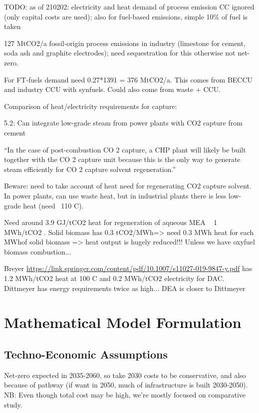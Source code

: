 TODO: as of 210202: electricity and heat demand of process emission CC ignored
(only capital costs are used); also for fuel-based emissions, simple 10\% of
fuel is taken

127 MtCO2/a fossil-origin process emissions in industry (limestone for cement,
soda ash and graphite electrodes); need sequestration for this otherwise not
net-zero.

For FT-fuels demand need 0.27*1391 = 376 MtCO2/a. This comes from BECCU and
industry CCU with synfuels. Could also come from waste + CCU.


Comparison of heat/electricity requirements for capture:

 5.2: Can integrate low-grade steam from power plants with
CO2 capture from cement

``In the case of post-combustion CO 2 capture, a CHP plant will likely be built
together with the CO 2 capture unit because this is the only way to generate
steam efficiently for CO 2 capture solvent regeneration.''

Beware: need to take account of heat need for regenerating CO2 capture solvent.
In power plants, can use waste heat, but in industrial plants there is less
low-grade heat (need ~110 C). 

Need around 3.9 GJ/tCO2 heat for regeneration of aqueous MEA ~ 1 MWh/tCO2
. Solid biomass has 0.3 tCO2/MWh\th => need 0.3 MWh heat for
each MWh\th of solid biomass => heat output is hugely reduced!!! Unless we have
oxyfuel biomass combustion...

Breyer \url{https://link.springer.com/content/pdf/10.1007/s11027-019-9847-y.pdf}
has 1.2 MWh/tCO2 heat at 100 C and 0.2 MWh\el/tCO2 electricity for DAC.
Dittmeyer has energy requirements twice as high... DEA is closer to Dittmeyer



\section{Mathematical Model Formulation}

\begin{landscape}

    

\section{Techno-Economic Assumptions}

Net-zero expected in 2035-2060, so take 2030 costs to be conservative, and also because of pathway (if want in 2050, much of infrastructure is built 2030-2050). NB: Even though total cost may be high, we're mostly focused on comparative study.

\begin{small}

\end{small}    

\end{landscape}

\restoregeometry
